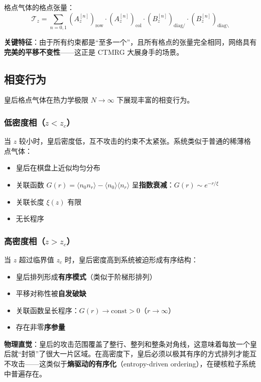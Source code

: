 \documentclass[12pt,a4paper]{ctexart}
\begin{document}
格点气体的格点张量：
\begin{equation}
\mathcal{T}_z = \sum_{n=0,1} (A_z^{[n]})_{\text{row}} \cdot (A_z^{[n]})_{\text{col}} \cdot (B_z^{[n]})_{\text{diag}/} \cdot (B_z^{[n]})_{\text{diag}\backslash}
\end{equation}

\textbf{关键特征}：由于所有约束都是``至多一个''，且所有格点的张量完全相同，网络具有\textbf{完美的平移不变性}——这正是 CTMRG 大展身手的场景。

\subsection{相变行为}

皇后格点气体在热力学极限 $N \to \infty$ 下展现丰富的相变行为。

\subsubsection{低密度相（$z < z_c$）}

当 $z$ 较小时，皇后密度低，互不攻击的约束不太紧张。系统类似于普通的稀薄格点气体：
\begin{itemize}
\item 皇后在棋盘上近似均匀分布
\item 关联函数 $G(r) = \langle n_0 n_r \rangle - \langle n_0 \rangle \langle n_r \rangle$ 呈\textbf{指数衰减}：$G(r) \sim e^{-r/\xi}$
\item 关联长度 $\xi(z)$ 有限
\item 无长程序
\end{itemize}

\subsubsection{高密度相（$z > z_c$）}

当 $z$ 超过临界值 $z_c$ 时，皇后密度高到系统被迫形成有序结构：
\begin{itemize}
\item 皇后排列形成\textbf{有序模式}（类似于阶梯形排列）
\item 平移对称性被\textbf{自发破缺}
\item 关联函数呈长程序：$G(r) \to \text{const} > 0$（$r \to \infty$）
\item 存在非零\textbf{序参量}
\end{itemize}

\textbf{物理直觉}：皇后的攻击范围覆盖了整行、整列和整条对角线，这意味着每放一个皇后就``封锁''了很大一片区域。在高密度下，皇后必须以极其有序的方式排列才能互不攻击——这类似于\textbf{熵驱动的有序化}（entropy-driven ordering），在硬核粒子系统中普遍存在。
\end{document}

